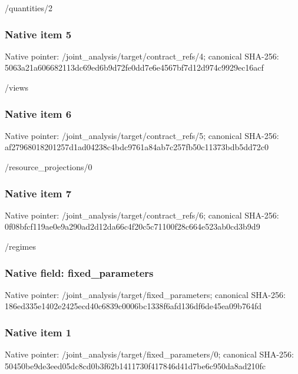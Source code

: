 \documentclass[10pt,a4paper]{article}
\begin{document}
\begingroup\raggedright\sloppy /\allowbreak{}quantities/\allowbreak{}2\par\endgroup

\subsubsection{Native item 5}
Native pointer: /joint\_\allowbreak{}analysis/target/contract\_\allowbreak{}refs/4; canonical SHA-256: 5063a21a606682113dc69ed6b9d72fe0dd7e6e4567bf7d12d974c9929ec16acf

\begingroup\raggedright\sloppy /\allowbreak{}views\par\endgroup

\subsubsection{Native item 6}
Native pointer: /joint\_\allowbreak{}analysis/target/contract\_\allowbreak{}refs/5; canonical SHA-256: af27968018201257d1ad04238c4bdc9761a84ab7c257fb50c11373bdb5dd72c0

\begingroup\raggedright\sloppy /\allowbreak{}resource\_\allowbreak{}projections/\allowbreak{}0\par\endgroup

\subsubsection{Native item 7}
Native pointer: /joint\_\allowbreak{}analysis/target/contract\_\allowbreak{}refs/6; canonical SHA-256: 0f08bfcf119ae0e9a290ad2d12da66c4f20c5c71100f28c664e523ab0cd3b9d9

\begingroup\raggedright\sloppy /\allowbreak{}regimes\par\endgroup

\subsubsection{Native field: fixed\_\allowbreak{}parameters}
Native pointer: /joint\_\allowbreak{}analysis/target/fixed\_\allowbreak{}parameters; canonical SHA-256: 186ed335e1402e2425ecd40c6839c0006bc1338f6afd136df6de45ea09b764fd

\subsubsection{Native item 1}
Native pointer: /joint\_\allowbreak{}analysis/target/fixed\_\allowbreak{}parameters/0; canonical SHA-256: 50450be9de3eed05dc8cd0b3f62b1411730f417846d41d7be6c950da8ad210fc
\end{document}
